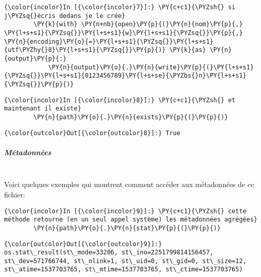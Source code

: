     \begin{Verbatim}[commandchars=\\\{\}]
{\color{incolor}In [{\color{incolor}7}]:} \PY{c+c1}{\PYZsh{} si j\PYZsq{}écris dedans je le crée}
        \PY{k}{with} \PY{n+nb}{open}\PY{p}{(}\PY{n}{nom}\PY{p}{,} \PY{l+s+s1}{\PYZsq{}}\PY{l+s+s1}{w}\PY{l+s+s1}{\PYZsq{}}\PY{p}{,} \PY{n}{encoding}\PY{o}{=}\PY{l+s+s1}{\PYZsq{}}\PY{l+s+s1}{utf\PYZhy{}8}\PY{l+s+s1}{\PYZsq{}}\PY{p}{)} \PY{k}{as} \PY{n}{output}\PY{p}{:}
            \PY{n}{output}\PY{o}{.}\PY{n}{write}\PY{p}{(}\PY{l+s+s1}{\PYZsq{}}\PY{l+s+s1}{0123456789}\PY{l+s+se}{\PYZbs{}n}\PY{l+s+s1}{\PYZsq{}}\PY{p}{)}
\end{Verbatim}


    \begin{Verbatim}[commandchars=\\\{\}]
{\color{incolor}In [{\color{incolor}8}]:} \PY{c+c1}{\PYZsh{} et maintenant il existe}
        \PY{n}{path}\PY{o}{.}\PY{n}{exists}\PY{p}{(}\PY{p}{)}
\end{Verbatim}


\begin{Verbatim}[commandchars=\\\{\}]
{\color{outcolor}Out[{\color{outcolor}8}]:} True
\end{Verbatim}
            
    \hypertarget{muxe9tadonnuxe9es}{%
\subparagraph{Métadonnées\\\\}\label{muxe9tadonnuxe9es}}

    Voici quelques exemples qui montrent comment accéder aux métadonnées de
ce fichier:

    \begin{Verbatim}[commandchars=\\\{\}]
{\color{incolor}In [{\color{incolor}9}]:} \PY{c+c1}{\PYZsh{} cette méthode retourne (en un seul appel système) les métadonnées agrégées}
        \PY{n}{path}\PY{o}{.}\PY{n}{stat}\PY{p}{(}\PY{p}{)}
\end{Verbatim}


\begin{Verbatim}[commandchars=\\\{\}]
{\color{outcolor}Out[{\color{outcolor}9}]:} os.stat\_result(st\_mode=33206, st\_ino=2251799814156457, st\_dev=571766744, st\_nlink=1, st\_uid=0, st\_gid=0, st\_size=12, st\_atime=1537703765, st\_mtime=1537703765, st\_ctime=1537703765)
\end{Verbatim}
            
